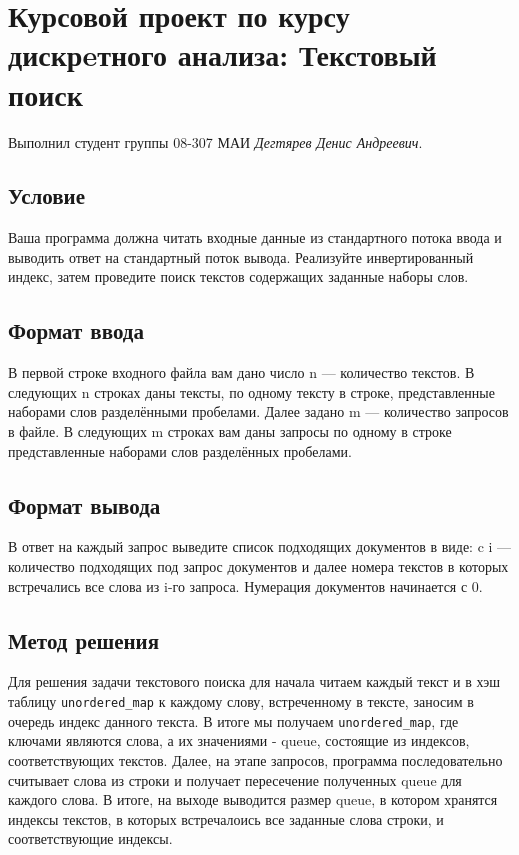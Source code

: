 \documentclass[12pt]{article}
\begin{document}
\section*{Курсовой проект по курсу дискрeтного анализа: Текстовый поиск}

Выполнил студент группы 08-307 МАИ \textit{Дегтярев Денис Андреевич}.

\subsection*{Условие}

Ваша программа должна читать входные данные из стандартного потока ввода и выводить ответ на стандартный поток вывода.
Реализуйте инвертированный индекс, затем проведите поиск текстов содержащих заданные наборы слов.

\subsection*{Формат ввода}

В первой строке входного файла вам дано число n — количество текстов. В следующих 
n строках даны тексты, по одному тексту в строке, представленные наборами слов разделёнными пробелами. Далее задано 
m
 — количество запросов в файле. В следующих 
m
 строках вам даны запросы по одному в строке представленные наборами слов разделённых пробелами.  

 \subsection*{Формат вывода}

В ответ на каждый запрос выведите список подходящих документов в виде: c i — количество подходящих под запрос документов и далее номера текстов в которых встречались все слова из i-го запроса. Нумерация документов начинается с 0.  

\subsection*{Метод решения}

Для решения задачи текстового поиска для начала читаем каждый текст и в хэш таблицу \texttt{unordered\_map} к каждому слову, встреченному в тексте, заносим в очередь индекс данного текста. 
В итоге мы получаем \texttt{unordered\_map}, где ключами являются слова, а их значениями - queue, состоящие из индексов, соответствующих текстов.  
Далее, на этапе запросов, программа последовательно считывает слова из строки и получает пересечение полученных queue для каждого слова. В итоге, на выходе выводится размер queue, 
в котором хранятся индексы текстов, в которых встречалоись все заданные слова строки, и соответствующие индексы.
\end{document}
